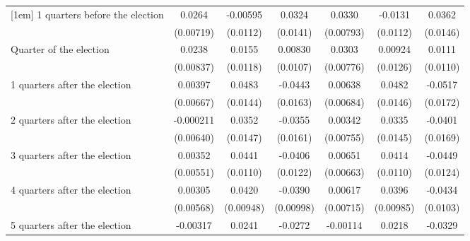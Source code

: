 \begin{table}[htbp]
\begin{tabular}{l*{6}{c}}
[1em]
 1 quarters before the election&      0.0264\sym{***}&    -0.00595         &      0.0324\sym{*}  &      0.0330\sym{***}&     -0.0131         &      0.0362\sym{*}  \\
                    &   (0.00719)         &    (0.0112)         &    (0.0141)         &   (0.00793)         &    (0.0112)         &    (0.0146)         \\
[1em]
Quarter of the election&      0.0238\sym{**} &      0.0155         &     0.00830         &      0.0303\sym{***}&     0.00924         &      0.0111         \\
                    &   (0.00837)         &    (0.0118)         &    (0.0107)         &   (0.00776)         &    (0.0126)         &    (0.0110)         \\
[1em]
 1 quarters after the election&     0.00397         &      0.0483\sym{***}&     -0.0443\sym{**} &     0.00638         &      0.0482\sym{***}&     -0.0517\sym{**} \\
                    &   (0.00667)         &    (0.0144)         &    (0.0163)         &   (0.00684)         &    (0.0146)         &    (0.0172)         \\
[1em]
 2 quarters after the election&   -0.000211         &      0.0352\sym{*}  &     -0.0355\sym{*}  &     0.00342         &      0.0335\sym{*}  &     -0.0401\sym{*}  \\
                    &   (0.00640)         &    (0.0147)         &    (0.0161)         &   (0.00755)         &    (0.0145)         &    (0.0169)         \\
[1em]
 3 quarters after the election&     0.00352         &      0.0441\sym{***}&     -0.0406\sym{***}&     0.00651         &      0.0414\sym{***}&     -0.0449\sym{***}\\
                    &   (0.00551)         &    (0.0110)         &    (0.0122)         &   (0.00663)         &    (0.0110)         &    (0.0124)         \\
[1em]
 4 quarters after the election&     0.00305         &      0.0420\sym{***}&     -0.0390\sym{***}&     0.00617         &      0.0396\sym{***}&     -0.0434\sym{***}\\
                    &   (0.00568)         &   (0.00948)         &   (0.00998)         &   (0.00715)         &   (0.00985)         &    (0.0103)         \\
[1em]
 5 quarters after the election&    -0.00317         &      0.0241\sym{*}  &     -0.0272\sym{**} &    -0.00114         &      0.0218\sym{*}  &     -0.0329\sym{**} \\

\end{tabular}
\end{table}
